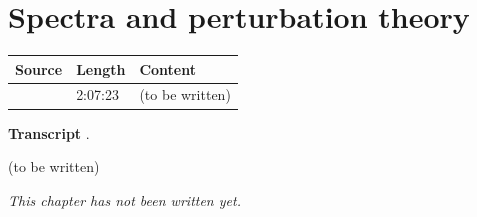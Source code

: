\chapter{Spectra and perturbation theory}\label{ch:c28}
\begin{paracol}{2}

\begin{sources}
\begin{tabularx}{\linewidth}{@{}l l L@{}}
\toprule
\textbf{Source} & \textbf{Length} & \textbf{Content}\\
\midrule
{} & 2:07:23 & (to be written)\\
\bottomrule
\end{tabularx}

\smallskip
\textbf{Transcript} .
\end{sources}

\begin{reading}
(to be written)
\end{reading}

\emph{This chapter has not been written yet.}

\flushside
\end{paracol}

